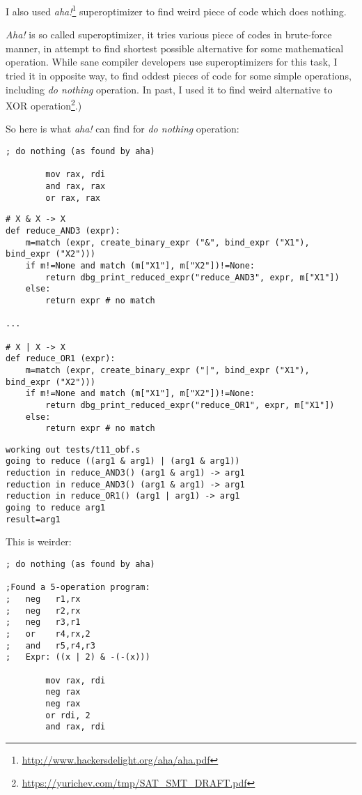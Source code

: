 ﻿\documentclass[12pt]{article}
\begin{document}
I also used \textit{aha!}\footnote{\url{http://www.hackersdelight.org/aha/aha.pdf}} superoptimizer to find weird piece of code which does nothing.

\textit{Aha!} is so called superoptimizer, it tries various piece of codes in brute-force manner, in attempt
to find shortest possible alternative for some mathematical operation.
While sane compiler developers use superoptimizers for this task, I tried it in opposite way, to find oddest
pieces of code for some simple operations, including \textit{do nothing} operation.
In past, I used it to find weird alternative to XOR operation\footnote{\url{https://yurichev.com/tmp/SAT_SMT_DRAFT.pdf}}.)

So here is what \textit{aha!} can find for \textit{do nothing} operation:

\begin{lstlisting}
; do nothing (as found by aha)

        mov rax, rdi
        and rax, rax
        or rax, rax
\end{lstlisting}

\begin{lstlisting}
# X & X -> X
def reduce_AND3 (expr):
    m=match (expr, create_binary_expr ("&", bind_expr ("X1"), bind_expr ("X2")))
    if m!=None and match (m["X1"], m["X2"])!=None:
        return dbg_print_reduced_expr("reduce_AND3", expr, m["X1"])
    else:
        return expr # no match

...

# X | X -> X
def reduce_OR1 (expr):
    m=match (expr, create_binary_expr ("|", bind_expr ("X1"), bind_expr ("X2")))
    if m!=None and match (m["X1"], m["X2"])!=None:
        return dbg_print_reduced_expr("reduce_OR1", expr, m["X1"])
    else:
        return expr # no match
\end{lstlisting}

\begin{lstlisting}
working out tests/t11_obf.s
going to reduce ((arg1 & arg1) | (arg1 & arg1))
reduction in reduce_AND3() (arg1 & arg1) -> arg1
reduction in reduce_AND3() (arg1 & arg1) -> arg1
reduction in reduce_OR1() (arg1 | arg1) -> arg1
going to reduce arg1
result=arg1
\end{lstlisting}

This is weirder:

\begin{lstlisting}
; do nothing (as found by aha)

;Found a 5-operation program:
;   neg   r1,rx
;   neg   r2,rx
;   neg   r3,r1
;   or    r4,rx,2
;   and   r5,r4,r3
;   Expr: ((x | 2) & -(-(x)))

        mov rax, rdi
        neg rax
        neg rax
        or rdi, 2
        and rax, rdi
\end{lstlisting}
\end{document}
